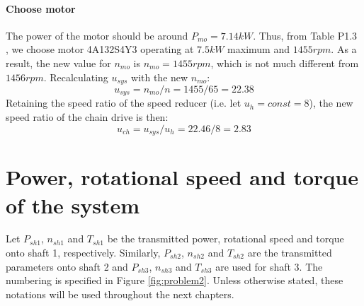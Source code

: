 \paragraph{Choose motor}
The power of the motor should be around $ P_{mo} = 7.14\unit{kW} $. Thus, from Table P1.3 \cite{tk1}, we choose motor 4A132S4Y3 operating at $ 7.5 \unit{kW} $ maximum and $ 1455 \unit{rpm} $. As a result, the new value for $ n_{mo} $ is $ n_{mo}=1455\unit{rpm} $, which is not much different from $ 1456\unit{rpm} $. Recalculating $ u_{sys} $ with the new $ n_{mo} $:
\[ u_{sys} = n_{mo}/n = 1455/65 = 22.38\]
Retaining the speed ratio of the speed reducer (i.e. let $ u_h = const = 8 $), the new speed ratio of the chain drive is then:
\[ u_{ch} = u_{sys}/u_h = {22.46}/{8} = 2.83\]

\section{Power, rotational speed and torque of the system}
Let $ P_{sh1} $, $ n_{sh1} $ and $ T_{sh1} $ be the transmitted power, rotational speed and torque onto shaft 1, respectively. Similarly, $ P_{sh2} $, $ n_{sh2} $ and $ T_{sh2} $ are the transmitted parameters onto shaft 2 and $ P_{sh3} $, $ n_{sh3} $ and $ T_{sh3} $ are used for shaft 3. The numbering is specified in Figure \ref{fig:problem2}. Unless otherwise stated, these notations will be used throughout the next chapters.

